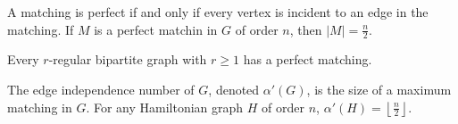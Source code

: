 \documentclass{article}
\begin{document}
\medskip{}

	A matching is perfect if and only if every vertex is incident to an edge in the matching. If $M$ is a perfect matchin in $G$ of order $n$, then $|M| = \frac n2$.


	Every $r$-regular bipartite graph with $r \geq 1$ has a perfect matching.


	The edge independence number of $G$, denoted $\alpha'(G)$, is the size of a maximum matching in $G$.
	For any Hamiltonian graph $H$ of order $n$, $\alpha'(H) = \left\lfloor \frac n2 \right\rfloor$.
\end{document}
